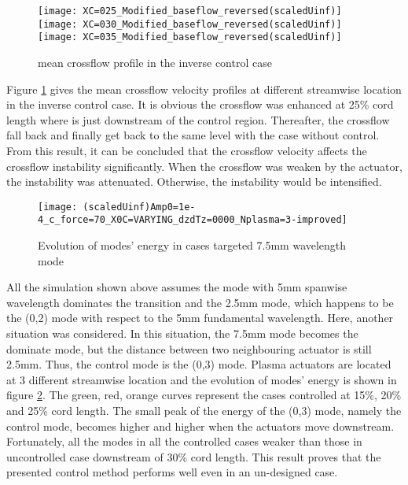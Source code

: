 \documentclass{AIAA}
\begin{document}
\begin{figure}
\centering
\texttt{[image: XC=025\_Modified\_baseflow\_reversed(scaledUinf)]}
\texttt{[image: XC=030\_Modified\_baseflow\_reversed(scaledUinf)]}
\texttt{[image: XC=035\_Modified\_baseflow\_reversed(scaledUinf)]}
\caption{mean crossflow profile in the inverse control case}%
\label{f:inverse_meanflow}
\end{figure}

Figure \ref{f:inverse_meanflow} gives the mean crossflow velocity profiles at different streamwise location in the inverse control case. It is obvious the crossflow was enhanced at 25\% cord length where is just downstream of the control region. Thereafter, the crossflow fall back and finally get back to the same level with the case without control. From this result, it can be concluded that the crossflow velocity affects the crossflow instability significantly. When the crossflow was weaken by the actuator, the instability was attenuated. Otherwise, the instability would be intensified.
\begin{figure}
\centering
\texttt{[image: (scaledUinf)Amp0=1e-4\_c\_force=70\_X0C=VARYING\_dzdTz=0000\_Nplasma=3-improved]}
\caption{Evolution of modes' energy in cases targeted 7.5mm wavelength mode}%
\label{f:7.5mm}
\end{figure}

All the simulation shown above assumes the mode with 5mm spanwise wavelength dominates the transition and the 2.5mm mode, which happens to be the (0,2) mode with respect to the 5mm fundamental wavelength. Here, another situation was considered. In this situation, the 7.5mm mode becomes the dominate mode, but the distance between two neighbouring actuator is still 2.5mm. Thus, the control mode is the (0,3) mode. Plasma actuators are located at 3 different streamwise location and the evolution of modes' energy is shown in figure \ref{f:7.5mm}. The green, red, orange curves represent the cases controlled at 15\%, 20\% and 25\% cord length. The small peak of the energy of the (0,3) mode, namely the control mode, becomes higher and higher when the actuators move downstream. Fortunately, all the modes in all the controlled cases weaker than those in uncontrolled case downstream of 30\% cord length. This result proves that the presented control method performs well even in an un-designed case.
\end{document}
